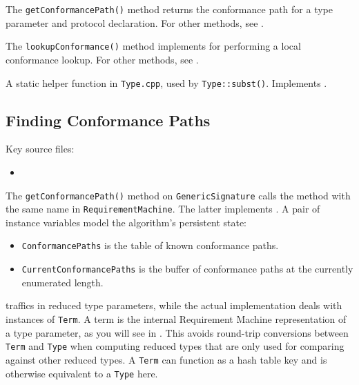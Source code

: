 \documentclass[../generics]{subfiles}
\begin{document}
The \verb|getConformancePath()| method returns the conformance path for a type parameter and protocol declaration. For other methods, see .

The \verb|lookupConformance()| method implements  for performing a local conformance lookup. For other methods, see .

A static helper function in \verb|Type.cpp|, used by \verb|Type::subst()|. Implements .

\subsection*{Finding Conformance Paths}

Key source files:
\begin{itemize}
\item {}
\end{itemize}
The \verb|getConformancePath()| method on \verb|GenericSignature| calls the method with the same name in \verb|RequirementMachine|. The latter implements . A pair of instance variables model the algorithm's persistent state:
\begin{itemize}
\item \verb|ConformancePaths| is the table of known conformance paths.
\item \verb|CurrentConformancePaths| is the buffer of conformance paths at the currently enumerated length.
\end{itemize}
 traffics in reduced type parameters, while the actual implementation deals with instances of \verb|Term|. A term is the internal Requirement Machine representation of a type parameter, as you will see in . This avoids round-trip conversions between \verb|Term| and \verb|Type| when computing reduced types that are only used for comparing against other reduced types. A \verb|Term| can function as a hash table key and is otherwise equivalent to a \verb|Type| here.
\end{document}

